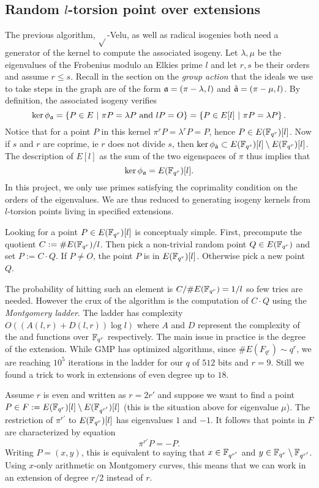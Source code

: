 \documentclass[../main.tex]{subfilesubs}
\begin{document}
\subsection{Random $l$-torsion point over extensions}
The previous algorithm, $\sqrt{}$-Velu, as well as radical isogenies both need a generator of the kernel to compute the associated isogeny.
Let $\lambda, \mu$ be the eigenvalues of the Frobenius modulo an Elkies prime $l$ and let $r, s$ be their orders and assume $r\leq s$.
Recall in the section on the \textit{group action} that the ideals we use to take steps in the graph are of the form $\mathfrak{a} = (\pi -\lambda, l)$ and $\hat{\mathfrak{a}} = (\pi -\mu, l)$.
By definition, the associated isogeny verifies
\[
        \ker\phi_{\mathfrak{a}} = \left\{P\in E\ |\ \pi P = \lambda P \text{ and } lP = O \right\} = \left\{P\in E[l]\ |\ \pi P = \lambda P  \right\}.
\]
Notice that for a point $P$ in this kernel $\pi^r P = \lambda^r P = P$, hence $P\in E(\mathbb{F}_{q^r})[l]$.
Now if $s$ and $r$ are coprime, ie $r$ does not divide $s$, then $\ker\phi_{\hat{\mathfrak{a}}} \subset  E(\mathbb{F}_{q^s})[l]\setminus E(\mathbb{F}_{q^r})[l]$.
The description of $E[l]$ as the sum of the two eigenspaces of $\pi$ thus implies that
\[
       \ker\phi_{\mathfrak{a}}  = E(\mathbb{F}_{q^r})[l].
\]
In this project, we only use primes satisfying the coprimality condition on the orders of the eigenvalues.
We are thus reduced to generating isogeny kernels from $l$-torsion points living in specified extensions.

Looking for a point $P\in E(\mathbb{F}_{q^r})[l]$ is conceptualy simple.
First, precompute the quotient $C := \#E(\mathbb{F}_{q^r}) / l$.
Then pick a non-trivial random point $Q\in E(\mathbb{F}_{q^r})$ and set $P := C\cdot Q$.
If $P\neq O$, the point $P$ is in $E(\mathbb{F}_{q^r})[l]$.
Otherwise pick a new point $Q$.

The probability of hitting such an element is $C/\#E(\mathbb{F}_{q^r}) = 1/l$ so few tries are needed.
However the crux of the algorithm is the computation of $C\cdot Q$ using the \textit{Montgomery ladder}.
The ladder has complexity $O((A(l, r) + D(l, r))\log{l})$ where $A$ and $D$ represent the complexity of the  and  functions over $\mathbb{F}_{q^r}$ respectively.
The main issue in practice is the degree of the extension.
While GMP has optimized algorithms, since $\# E(F_{q^r}) \sim q^r$, we are reaching $10^5$ iterations in the ladder for our $q$ of $512$ bits and $r=9$.
Still we found a trick to work in extensions of even degree up to $18$.

Assume $r$ is even and written as $r = 2r'$ and suppose we want to find  a point $P\in F : = E(\mathbb{F}_{q^r})[l]\setminus E(\mathbb{F}_{q^{r'}})[l]$ (this is the situation above for eigenvalue $\mu$).
The restriction of $\pi^{r'}$ to $E(\mathbb{F}_{q^r})[l]$  has eigenvalues $1$ and $-1$.
It follows that points in $F$ are characterized by equation
\[
	\pi^{r'} P = -P.
\]
Writing $P=(x, y)$, this is equivalent to saying that $x\in \mathbb{F}_{q^{r'}}$ and $y\in \mathbb{F}_{q^{r}}\setminus\mathbb{F}_{q^{r'}}$.
Using $x$-only arithmetic on Montgomery curves, this means that we can work in an extension of degree $r/2$ instead of $r$.
\end{document}
